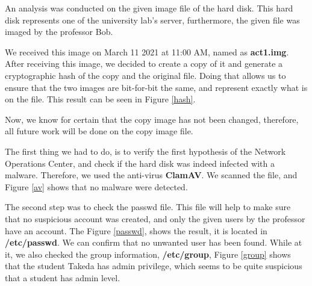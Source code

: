 \documentclass[a4paper,12pt]{article}
\begin{document}

An analysis was conducted on the given image file of the hard disk. This hard disk represents one of the university lab's server, furthermore, the given file was imaged by the professor Bob. 

We received this image on March 11 2021 at 11:00 AM, named as \textbf{act1.img}. After receiving this image, we decided to create a copy of it and generate a cryptographic hash of the copy and the original file. Doing that allows us to ensure that the two images are bit-for-bit the same, and represent exactly what is on the file. This result can be seen in Figure \ref{hash}. 

Now, we know for certain that the copy image has not been changed, therefore, all future work will be done on the copy image file. 

The first thing we had to do, is to verify the first hypothesis of the Network Operations Center, and check if the hard disk was indeed infected with a malware. Therefore, we used the anti-virus \textbf{ClamAV}. We scanned the file, and Figure \ref{av} shows that no malware were detected.

The second step was to check the passwd file. This file will help to make sure that no suspicious account was created, and only the given users by the professor have an account. The Figure \ref{passwd}, shows the result, it is located in \textbf{/etc/passwd}. We can confirm that no unwanted user has been found. While at it, we also checked the group information, \textbf{/etc/group}, Figure \ref{group} shows that the student Takeda has admin privilege, which seems to be quite suspicious that a student has admin level. 
%
\end{document}
